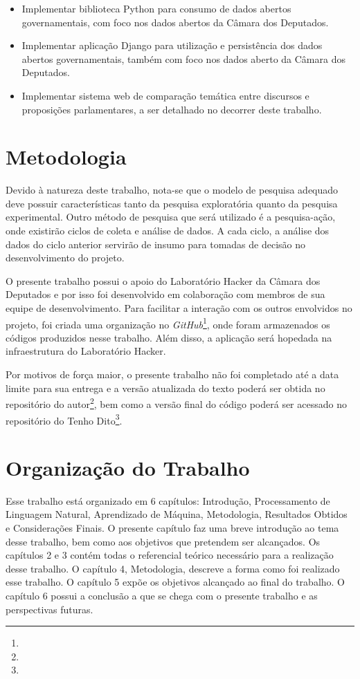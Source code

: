 \begin{itemize}
    \item Implementar biblioteca Python para consumo de dados abertos governamentais, com foco nos dados abertos da Câmara dos Deputados.
    \item Implementar aplicação Django para utilização e persistência dos dados abertos governamentais, também com foco nos dados aberto da Câmara dos Deputados.
    \item Implementar sistema web de comparação temática entre discursos e proposições parlamentares, a ser detalhado no decorrer deste trabalho.
\end{itemize}

\section{Metodologia}
\label{sub:metodologia}

Devido à natureza deste trabalho, nota-se que o modelo de pesquisa adequado deve possuir características tanto da pesquisa exploratória quanto da pesquisa experimental. Outro método de pesquisa que será utilizado é a pesquisa-ação, onde existirão ciclos de coleta e análise de dados. A cada ciclo, a análise dos dados do ciclo anterior servirão de insumo para tomadas de decisão no desenvolvimento do projeto.

O presente trabalho possui o apoio do Laboratório Hacker da Câmara dos Deputados e por isso foi desenvolvido em colaboração com membros de sua equipe de desenvolvimento. Para facilitar a interação com os outros envolvidos no projeto, foi criada uma organização no \textit{GitHub}\footnote{}, onde foram armazenados os códigos produzidos nesse trabalho. Além disso, a aplicação será hopedada na infraestrutura do Laboratório Hacker.

Por motivos de força maior, o presente trabalho não foi completado até a data limite para sua entrega e a versão atualizada do texto poderá ser obtida no repositório do autor\footnote{}, bem como a versão final do código poderá ser acessado no repositório do Tenho Dito\footnote{}.

\section{Organização do Trabalho}
\label{sec:organização_do_trabalho}

Esse trabalho está organizado em 6 capítulos: Introdução, Processamento de Linguagem Natural, Aprendizado de Máquina, Metodologia, Resultados Obtidos e Considerações Finais. O presente capítulo faz uma breve introdução ao tema desse trabalho, bem como aos objetivos que pretendem ser alcançados. Os capítulos 2 e 3 contém todas o referencial teórico necessário para a realização desse trabalho. O capítulo 4, Metodologia, descreve a forma como foi realizado esse trabalho. O capítulo 5 expõe os objetivos alcançado ao final do trabalho. O capítulo 6 possui a conclusão a que se chega com o presente trabalho e as perspectivas futuras.
